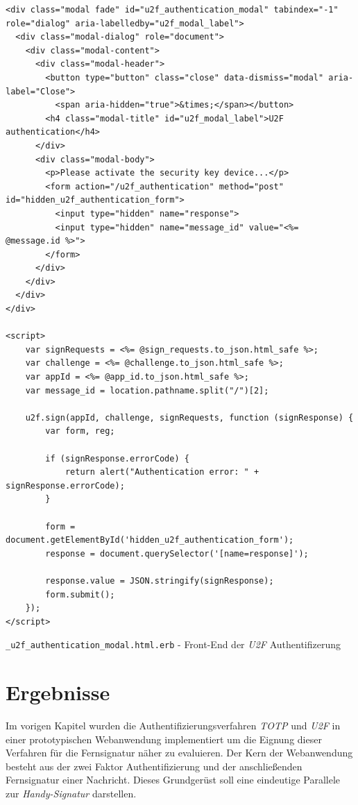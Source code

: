 \documentclass[11pt,a4paper,ngerman]{scrreprt}
\begin{document}
\begin{listing}[htpb]
    \begin{verbatim}
<div class="modal fade" id="u2f_authentication_modal" tabindex="-1" role="dialog" aria-labelledby="u2f_modal_label">
  <div class="modal-dialog" role="document">
    <div class="modal-content">
      <div class="modal-header">
        <button type="button" class="close" data-dismiss="modal" aria-label="Close">
          <span aria-hidden="true">&times;</span></button>
        <h4 class="modal-title" id="u2f_modal_label">U2F authentication</h4>
      </div>
      <div class="modal-body">
        <p>Please activate the security key device...</p>
        <form action="/u2f_authentication" method="post" id="hidden_u2f_authentication_form">
          <input type="hidden" name="response">
          <input type="hidden" name="message_id" value="<%= @message.id %>">
        </form>
      </div>
    </div>
  </div>
</div>

<script>
    var signRequests = <%= @sign_requests.to_json.html_safe %>;
    var challenge = <%= @challenge.to_json.html_safe %>;
    var appId = <%= @app_id.to_json.html_safe %>;
    var message_id = location.pathname.split("/")[2];

    u2f.sign(appId, challenge, signRequests, function (signResponse) {
        var form, reg;

        if (signResponse.errorCode) {
            return alert("Authentication error: " + signResponse.errorCode);
        }

        form = document.getElementById('hidden_u2f_authentication_form');
        response = document.querySelector('[name=response]');

        response.value = JSON.stringify(signResponse);
        form.submit();
    });
</script>
    \end{verbatim}
    \caption{\texttt{\_u2f\_authentication\_modal.html.erb} - Front-End der \textit{U2F} Authentifizerung}
    \label{lst:u2f_auth_modal.html.erb}
\end{listing}

\chapter{Ergebnisse}
Im vorigen Kapitel wurden die Authentifizierungsverfahren \textit{TOTP} und \textit{U2F} in einer prototypischen Webanwendung implementiert um die Eignung dieser Verfahren für die Fernsignatur näher zu evaluieren. Der Kern der Webanwendung besteht aus der zwei Faktor Authentifizierung und der anschließenden Fernsignatur einer Nachricht. Dieses Grundgerüst soll eine eindeutige Parallele zur \textit{Handy-Signatur} darstellen.
\end{document}
